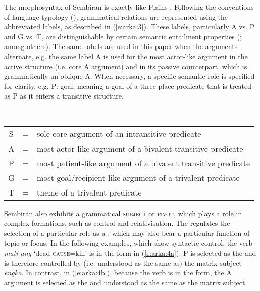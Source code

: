 \documentclass[output=paper
,modfonts
,nonflat]{langsci/langscibook}
\begin{document}
\noindent
The morphosyntax of Sembiran  is exactly like Plains . Following the conventions of language typology (\citealt{Comrie1978,Dixon1979,Croft2003,Haspelmath2007,Comrie2005,Bickel2011}), grammatical relations are represented using the abbreviated labels, as described in (\ref{e:arka:3}). These labels, particularly A vs. P and G vs. T, are distinguishable by certain semantic entailment properties (\citealt{Dowty1991,Bickel2011,WitzlackMakarevich2011}; among others).  The same labels are used in this paper when the arguments alternate, e.g. the same label A is used for the most actor-like argument in the active structure (i.e. core A argument) and in its passive counterpart, which is grammatically an oblique A. When necessary, a specific semantic role is specified for clarity, e.g. P: goal, meaning a goal of a three-place predicate that is treated as P as it enters a transitive structure. 

 
\begin{exe}
	\\\label{e:arka:3}
	\begin{tabular}[t]{cll}
		S & = & sole core argument of an intransitive predicate\\
		A & = & most actor-like argument of a bivalent transitive predicate\\
		P & = & most patient-like argument of a bivalent transitive predicate\\
		G & = & most goal/recipient-like argument of a trivalent predicate\footnotemark \\
		T & = & theme of a trivalent predicate 
	\end{tabular}
\end{exe}

\noindent
Sembiran  also exhibits a grammatical \textsc{subject} or \textsc{pivot}, which plays a role in complex  formations, such as control and relativisation. The  regulates the selection of a particular role as a , which may also bear a particular  function of topic or focus. In the following examples, which show syntactic control, the verb \textit{mati-ang} ‘dead-\textsc{cause}=kill’ is in the  form in (\ref{e:arka:4a}). P is selected as the  and is therefore controlled by (i.e. understood as the same as) the matrix subject \textit{engko}. In contrast, in (\ref{e:arka:4b}), because the verb is in the  form, the A argument is selected as the  and understood as the same as the matrix subject. 
\end{document}
